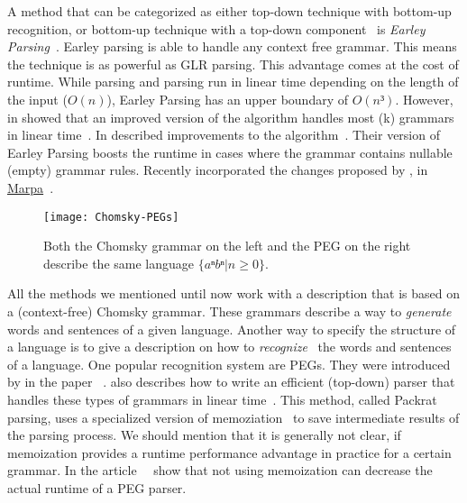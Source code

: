 A method that can be categorized as either top-down technique with bottom-up recognition, or bottom-up technique with a top-down component~\cite[p. 206]{grune2008parsing} is \emph{Earley Parsing}~\cite{earley1970efficient}. Earley parsing is able to handle any context free grammar. This means the technique is as powerful as GLR parsing. This advantage comes at the cost of runtime. While  parsing and  parsing run in linear time depending on the length of the input ($O(n)$), Earley Parsing has an upper boundary of $O(n³)$. However, in \citeyear{leo1991general} \citeauthor{leo1991general} showed that an improved version of the algorithm handles most (k) grammars in linear time~\cite{kegler2011marpa, leo1991general}. In \citeyear{aycock2002practical} \citeauthor{aycock2002practical} described improvements to the algorithm~\cite{aycock2002practical}. Their version of Earley Parsing boosts the runtime in cases where the grammar contains nullable (empty) grammar rules. Recently \citeauthor{kegler2011marpa} incorporated the changes proposed by \citeauthor{leo1991general}, \citeauthor{aycock2002practical} in \href{http://savage.net.au/Marpa.html}{Marpa}~\cite{kegler2011marpa}.

\begin{figure}
  \centering
    \texttt{[image: Chomsky-PEGs]}
  \caption{Both the Chomsky grammar on the left and the PEG on the right describe the same language $ \{ aⁿ bⁿ | n ≥ 0 \} $.}
\end{figure}

All the methods we mentioned until now work with a description that is based on a (context-free) Chomsky grammar. These grammars describe a way to \emph{generate} words and sentences of a given language. Another way to specify the structure of a language is to give a description on how to \emph{recognize}~\cite[p. 506]{grune2008parsing} the words and sentences of a language. One popular recognition system are \glspl{PEG}. They were introduced by \citeauthor{ford2004parsing} in the paper ~\cite{ford2004parsing}. \citeauthor{ford2002packrat} also describes how to write an efficient (top-down) parser that handles these types of grammars in linear time~\cite{ford2002packrat}. This method, called Packrat parsing, uses a specialized version of memoziation~\cite[p. 1]{ford2002packrat} to save intermediate results of the parsing process. We should mention that it is generally not clear, if memoization provides a runtime performance advantage in practice for a certain grammar. In the article~~\cite{hudak2008dcgs} \citeauthor{hudak2008dcgs} show that not using memoization can decrease the actual runtime of a PEG parser.

